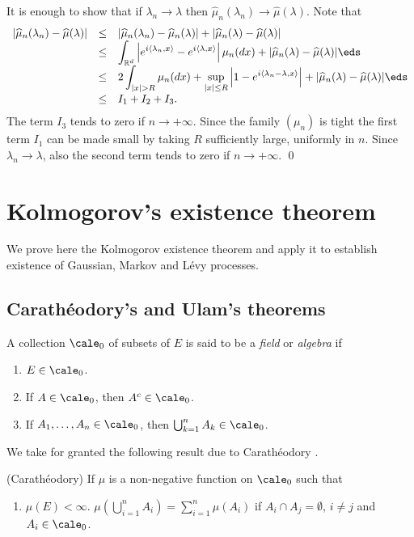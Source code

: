 \documentclass[preprint]{imsart}
\def\R{\mathbb R}
\def\ds{\displaystyle}
\begin{document}
{
It is enough to show that if $\lambda_n\to\lambda$ then
$\widehat{\mu}_n(\lambda_n)\to \widehat{\mu}(\lambda).$
Note that
$$
  \begin{array}{lll}
    | \widehat{\mu}_n(\lambda_n) - \widehat{\mu}(\lambda)|
& \leq  & | \widehat{\mu}_n(\lambda_n) -
\widehat{\mu}_n(\lambda)| +
| \widehat{\mu}_n(\lambda) - \widehat{\mu}(\lambda)|
 \\
    &\leq & \ds
    \int_{\R^d} \left|   e^{i\langle
 \lambda_n ,x\rangle}-  e^{i\langle
 \lambda ,x\rangle}\right|\mu_n(dx)
 +
| \widehat{\mu}_n(\lambda) - \widehat{\mu}(\lambda)|
\eds\\
&\leq & \ds 2 \int_{|x|>R}\mu_n(dx)+ \sup_{|x|\leq R}
 \left| 1-  e^{i\langle
 \lambda_n -\lambda ,x\rangle} \right|
 +
| \widehat{\mu}_n(\lambda) - \widehat{\mu}(\lambda)|
\eds\\
&\leq &I_1+I_2+I_3.
  \end{array}
$$
 The term
$I_3$ tends to zero if $n\to +\infty$. Since the family
$(\mu_n)$ is tight the first term $I_1$ can be made
small by taking $R$ sufficiently large, uniformly in
$n$. Since $\lambda_n\to\lambda$, also the second term
tends to zero if $n\to +\infty$. \qed





\chapter{Kolmogorov's existence theorem}
We prove here the Kolmogorov existence theorem and apply it to establish existence of Gaussian, Markov and L\'evy
processes.


\section{Carath\'eodory's and Ulam's theorems}

A collection $\cale_0$ of subsets of $ E$ is said
to be a {\em field} or {\em algebra} if
\begin{enumerate}
  \item[1)] $E\in \cale_0$.

  \item[2)] If $A\in \cale_0$, then $A^c\in\cale_0$.

  \item[3)] If $A_1,\ldots,A_n\in\cale_0$, then
  $\bigcup_{k=1}^nA_k\in\cale_0$.
\end{enumerate}

We take for granted the following result due to Carath\'eodory \cite{bibIV}.
\begin{Theorem} (Carath\'eodory)
If $\mu$ is a non-negative function on $\cale_0$ such that
\begin{enumerate}
  \item[1)] $\mu (E)< \infty$.
   $\mu (\bigcup_{i=1}^nA_i)
  =\sum_{i=1}^n \mu(A_i)$ if $A_i\cap A_j=\emptyset$,
  $i\ne j$ and $A_i\in\cale_0$.



\end{enumerate}
\end{Theorem}}
\end{document}
